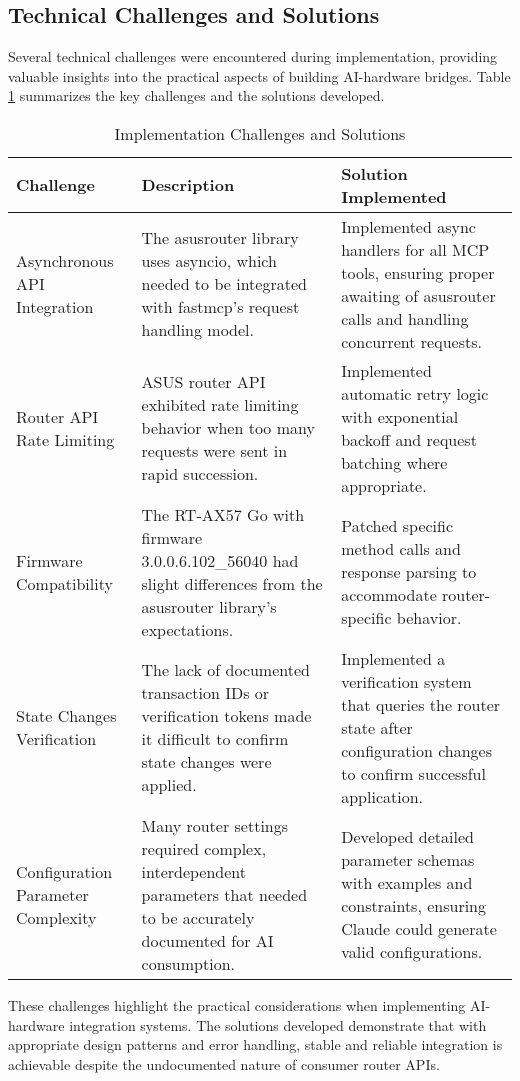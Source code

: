 \subsection{Technical Challenges and Solutions}
Several technical challenges were encountered during implementation, providing valuable insights into the practical aspects of building AI-hardware bridges. Table \ref{tab:implementation-challenges} summarizes the key challenges and the solutions developed.

\begin{table}[htbp]
\caption{Implementation Challenges and Solutions}
\label{tab:implementation-challenges}
\begin{tabular}{|p{3.5cm}|p{5.5cm}|p{5.5cm}|}
\hline
\textbf{Challenge} & \textbf{Description} & \textbf{Solution Implemented} \\ \hline
Asynchronous API Integration & The asusrouter library uses asyncio, which needed to be integrated with fastmcp's request handling model. & Implemented async handlers for all MCP tools, ensuring proper awaiting of asusrouter calls and handling concurrent requests. \\ \hline
Router API Rate Limiting & ASUS router API exhibited rate limiting behavior when too many requests were sent in rapid succession. & Implemented automatic retry logic with exponential backoff and request batching where appropriate. \\ \hline
Firmware Compatibility & The RT-AX57 Go with firmware 3.0.0.6.102\_56040 had slight differences from the asusrouter library's expectations. & Patched specific method calls and response parsing to accommodate router-specific behavior. \\ \hline
State Changes Verification & The lack of documented transaction IDs or verification tokens made it difficult to confirm state changes were applied. & Implemented a verification system that queries the router state after configuration changes to confirm successful application. \\ \hline
Configuration Parameter Complexity & Many router settings required complex, interdependent parameters that needed to be accurately documented for AI consumption. & Developed detailed parameter schemas with examples and constraints, ensuring Claude could generate valid configurations. \\ \hline
\end{tabular}
\end{table}

These challenges highlight the practical considerations when implementing AI-hardware integration systems. The solutions developed demonstrate that with appropriate design patterns and error handling, stable and reliable integration is achievable despite the undocumented nature of consumer router APIs.

